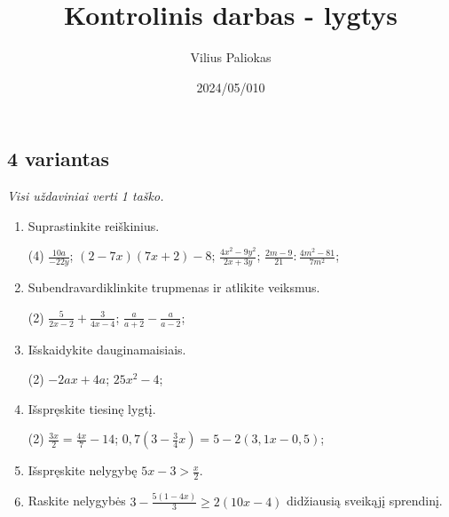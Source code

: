 \documentclass[a4paper]{article}
\title{Kontrolinis darbas - lygtys}
\author{Vilius Paliokas}
\date{2024/05/010}
\begin{document}
\thispagestyle{fancy}

\titlespacing*{\subsection}{0pt}{.75ex}{0.75ex}

\subsection*{4 variantas}

\textit{Visi uždaviniai verti 1 taško.}

\begin{enumerate}
      \item Suprastinkite reiškinius.
            \begin{tasks}[item-format={\normalfont}, after-item-skip=2mm](4)
                  \task $\frac{10a}{-22y}$;
                  \task $(2-7x)(7x+2)-8$;
                  \task $\frac{4x^2-9y^2}{2x+3y}$;
                  \task $\frac{2m-9}{21}:\frac{4m^2-81}{7m^2}$;
            \end{tasks}

      \item Subendravardiklinkite trupmenas ir atlikite veiksmus.
            \begin{tasks}[item-format={\normalfont}, after-item-skip=2mm](2)
                  \task $\frac{5}{2x-2}+\frac{3}{4x-4}$;
                  \task $\frac{a}{a+2}-\frac{a}{a-2}$;
            \end{tasks}

      \item Išskaidykite dauginamaisiais.
            \begin{tasks}[item-format={\normalfont}, after-item-skip=2mm](2)
                  \task $-2ax+4a$;
                  \task $25x^2-4$;
            \end{tasks}

      \item Išspręskite tiesinę lygtį.
            \begin{tasks}[item-format={\normalfont}, after-item-skip=2mm](2)
                  \task $\frac{3x}{2}=\frac{4x}{7}-14$;
                  \task $0,7(3-\frac{3}{4}x)=5-2(3,1x-0,5)$;
            \end{tasks}

      \item Išspręskite nelygybę $5x-3>\frac{x}{2}$.
      \item Raskite nelygybės $3-\frac{5(1-4x)}{3}\geq2(10x-4)$ didžiausią sveikąjį sprendinį.
\end{enumerate}
\end{document}
